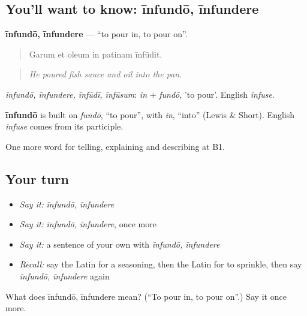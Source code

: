 \subsection*{You'll want to know: īnfundō, īnfundere}
\textbf{īnfundō, īnfundere} — \textquotedblleft{}to pour in, to pour on\textquotedblright{}.

\begin{quote}
Garum et oleum in patinam īnfūdit.
\end{quote}

\begin{quote}
\emph{He poured fish sauce and oil into the pan.}
\end{quote}

\emph{īnfundō, īnfundere, īnfūdī, īnfūsum}: \emph{in} + \emph{fundō}, 'to pour'. English \emph{infuse}.

\begin{cousinweb}
\textbf{īnfundō} is built on \emph{fundō}, \textquotedblleft{}to pour\textquotedblright{}, with \emph{in}, \textquotedblleft{}into\textquotedblright{} (Lewis \& Short). English \emph{infuse} comes from its participle.
\end{cousinweb}

\begin{grammarlens}[title={What you've built}]
One more word for telling, explaining and describing at B1.
\end{grammarlens}

\subsection*{Your turn}
\begin{itemize}
\raggedright
  \item \emph{Say it:} \emph{īnfundō, īnfundere}
  \item \emph{Say it:} \emph{īnfundō, īnfundere}, once more
  \item \emph{Say it:} a sentence of your own with \emph{īnfundō, īnfundere}
  \item \emph{Recall:} say the Latin for a seasoning, then the Latin for to sprinkle, then say \emph{īnfundō, īnfundere} again
\end{itemize}

\begin{tcolorbox}[breakable,colback=teal!4,colframe=teal!35!black,title={Before you move on}]
What does īnfundō, īnfundere mean? (\textquotedblleft{}To pour in, to pour on\textquotedblright{}.) Say it once more.
\end{tcolorbox}
